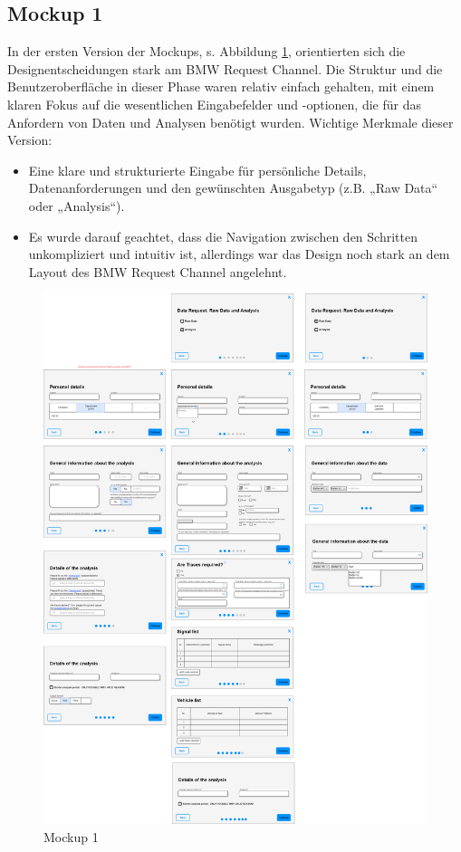 \subsection*{Mockup 1}
In der ersten Version der Mockups, s. Abbildung \ref{fig:MockUps1.0}, orientierten sich die Designentscheidungen stark am BMW Request Channel. Die Struktur und die Benutzeroberfläche in dieser Phase waren relativ einfach gehalten, mit einem klaren Fokus auf die wesentlichen Eingabefelder und -optionen, die für das Anfordern von Daten und Analysen benötigt wurden.
\newline
Wichtige Merkmale dieser Version:
\begin{itemize}
    \item Eine klare und strukturierte Eingabe für persönliche Details, Datenanforderungen und den gewünschten Ausgabetyp (z.B. „Raw Data“ oder „Analysis“).
    \item Es wurde darauf geachtet, dass die Navigation zwischen den Schritten unkompliziert und intuitiv ist, allerdings war das Design noch stark an dem Layout des BMW Request Channel angelehnt.
\end{itemize}
\begin{figure}[H]
    \centering
    \includegraphics[scale=.2]{media/MockUps1.0}
    \caption{Mockup 1}
    \label{fig:MockUps1.0}
\end{figure}
